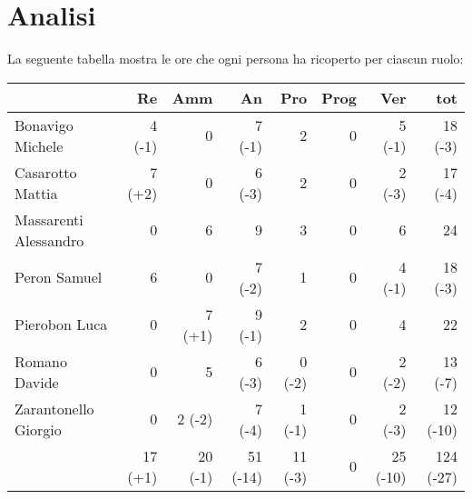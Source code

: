 \section{Analisi}

La seguente tabella mostra le ore che ogni persona ha ricoperto per ciascun ruolo:
\begin{table}[ht]
    \begin{tabularx}{\linewidth}{X|rrrrrrr}
    \rowcolor{gray!30}& Re & Amm & An & Pro & Prog & Ver & tot \\
    \hline
    Bonavigo Michele                        & 4 (-1)   & 0          & 7 (-1)       & 2          & 0     & 5 (-1)   & 18 (-3) \\

    \rowcolor{gray!10}Casarotto Mattia      & 7 (+2)   & 0          & 6 (-3)       & 2          & 0     & 2 (-3)   & 17 (-4) \\

    Massarenti Alessandro                   & 0        & 6          & 9            & 3          & 0     & 6        & 24 \\ 

    \rowcolor{gray!10}Peron Samuel          & 6        & 0          & 7 (-2)       & 1          & 0     & 4 (-1)   & 18 (-3) \\ 

    Pierobon Luca                           & 0        & 7 (+1)     & 9 (-1)       & 2          & 0     & 4        & 22 \\ 

    \rowcolor{gray!10}Romano Davide         & 0        & 5          & 6 (-3)       & 0 (-2)     & 0     & 2 (-2)   & 13 (-7)\\

    Zarantonello Giorgio                    & 0        & 2 (-2)     & 7 (-4)       & 1 (-1)     & 0     & 2 (-3)   & 12 (-10)\\

    \hline                                  & 17 (+1)  & 20 (-1)    & 51 (-14)     & 11 (-3)    & 0     & 25 (-10) & 124 (-27)\\  
    \end{tabularx}
\end{table}

